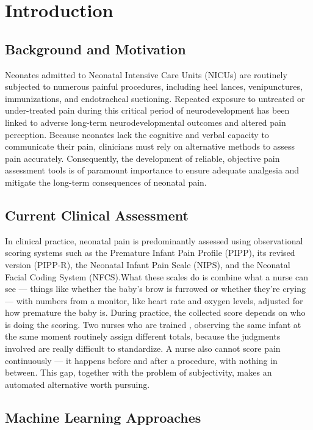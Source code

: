 \documentclass[conference]{IEEEtran}
\begin{document}
\section{Introduction}

\subsection{Background and Motivation}

Neonates admitted to Neonatal Intensive Care Units (NICUs) are routinely subjected to numerous painful procedures, including heel lances, venipunctures, immunizations, and endotracheal suctioning. Repeated exposure to untreated or under-treated pain during this critical period of neurodevelopment has been linked to adverse long-term neurodevelopmental outcomes and altered pain perception. Because neonates lack the cognitive and verbal capacity to communicate their pain, clinicians must rely on alternative methods to assess pain accurately. Consequently, the development of reliable, objective pain assessment tools is of paramount importance to ensure adequate analgesia and mitigate the long-term consequences of neonatal pain.

\subsection{Current Clinical Assessment}

In clinical practice, neonatal pain is predominantly assessed using observational scoring systems such as the Premature Infant Pain Profile (PIPP)\cite{stevens1996pipp}, its revised version (PIPP-R)\cite{stevens2014pippr}, the Neonatal Infant Pain Scale (NIPS)\cite{lawrence1993nips}, and the Neonatal Facial Coding System (NFCS)\cite{grunau1987nfcs}.What these scales do is combine what a nurse can see — things like whether the baby's brow is furrowed or whether they're crying — with numbers from a monitor, like heart rate and oxygen levels, adjusted for how premature the baby is. During practice, the collected score depends on who is doing the scoring. Two nurses who are trained , observing the same infant at the same moment routinely assign different totals, because the judgments involved are really difficult to standardize. A nurse also cannot score pain continuously — it happens before and after a procedure, with nothing in between. This gap, together with the problem of subjectivity, makes an automated alternative worth pursuing.

\subsection{Machine Learning Approaches}
\end{document}
